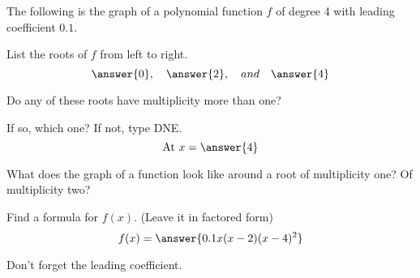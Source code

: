 \documentclass{ximera}
\author{Bobby Ramsey}
\begin{document}
The following is the graph of a polynomial function $f$ of degree 4 with leading coefficient $0.1$.  
\begin{image}
\end{image}


\begin{exercise}
	List the roots of $f$ from left to right.
	\[ \answer{0}, \quad  \answer{2}, \quad and\quad \answer{4} \]
\end{exercise}

\begin{exercise}
	Do any of these roots have multiplicity more than one? 
	\begin{multipleChoice}
	\end{multipleChoice}
	If so, which one?  If not, type DNE.  \[\text{At } x = \answer{4}\]
\end{exercise}
\begin{hint}
	What does the graph of a function look like around a root of multiplicity one?  Of multiplicity two?
\end{hint}

\begin{exercise}
	Find a formula for $f(x)$.	(Leave it in factored form)
	\[ f(x) = \answer{0.1x(x-2)(x-4)^2} \]
\end{exercise}
\begin{hint}
	Don't forget the leading coefficient. 
\end{hint}
\end{document}
